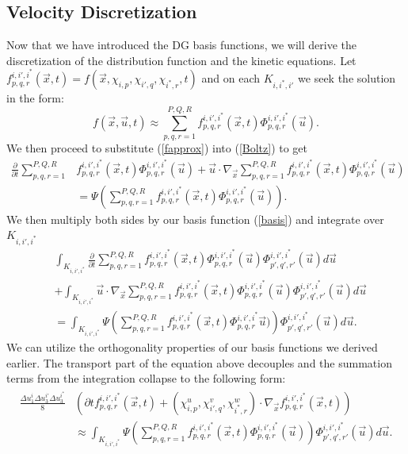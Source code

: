 \subsection{Velocity Discretization}
Now that we have introduced the DG basis functions, we will derive the discretization of the distribution function and the kinetic equations. Let $f^{i,i',i^*}_{p,q,r}(\vec{x},t) = f(\vec{x},\chi_{i,p},\chi_{i',q},\chi_{i^*,r},t)$ and on each $K_{i,i^*,i'}$ we seek the solution in the form:
%
\begin{equation}
\label{fapprox}
f(\vec{x},\vec{u},t) \approx \sum_{p,q,r = 1}^{P,Q,R} f^{i,i',i^*}_{p,q,r}(\vec{x},t) \Phi^{i,i',i^*}_{p,q,r} (\vec{u}).
\end{equation}
%
We then proceed to substitute (\ref{fapprox}) into (\ref{Boltz}) to get
%
\begin{align*}
\frac{\partial}{\partial t} \sum_{p,q,r = 1}^{P,Q,R}& f^{i,i',i^*}_{p,q,r}(\vec{x},t) \Phi^{i,i',i^*}_{p,q,r}(\vec{u}) + \vec{u} \cdot \nabla_{\vec{x}} \sum_{p,q,r = 1}^{P,Q,R} f^{i,i',i^*}_{p,q,r}(\vec{x},t) \Phi^{i,i',i^*}_{p,q,r}(\vec{u})\\
&= \Psi \left(\sum_{p,q,r = 1}^{P,Q,R} f^{i,i',i^*}_{p,q,r}(\vec{x},t) \Phi^{i,i',i^*}_{p,q,r}(\vec{u})\right).
\end{align*}
%
We then multiply both sides by our basis function (\ref{basis}) and integrate over $K_{i,i',i^*}$
%
\begin{align*}
&\int_{K_{i,i',i^*}} \frac{\partial}{\partial t} \sum_{p,q,r = 1}^{P,Q,R} f^{i,i',i^*}_{p,q,r}(\vec{x},t) \Phi^{i,i',i^*}_{p,q,r}(\vec{u}) \Phi^{i,i',i^*}_{p',q',r'}(\vec{u}) d\vec{u}\\
&+ \int_{K_{i,i',i^*}} \vec{u} \cdot \nabla_{\vec{x}} \sum_{p,q,r = 1}^{P,Q,R} f^{i,i',i^*}_{p,q,r}(\vec{x},t) \Phi^{i,i',i^*}_{p,q,r}(\vec{u}) \Phi^{i,i',i^*}_{p',q',r'}(\vec{u}) d\vec{u}\\
&= \int_{K_{i,i',i^*}} \Psi \left(\sum_{p,q,r = 1}^{P,Q,R} f^{i,i',i^*}_{p,q,r}(\vec{x},t) \Phi^{i,i',i^*}_{p,q,r}\vec{u})\right) \Phi^{i,i',i^*}_{p',q',r'}(\vec{u}) d\vec{u}.
\end{align*}
%
We can utilize the orthogonality properties of our basis functions we derived earlier. The transport part of the equation above decouples and the summation terms from the integration collapse to the following form:
%
\begin{gather}
\begin{aligned}
\label{discreting}
\frac{\Delta u_1^i \Delta u_3^{i'} \Delta u_3^{i^*}}{8} &\left( \partial t f^{i,i',i^*}_{p,q,r}(\vec{x},t) + (\chi_{i,p}^u,\chi_{i',q}^v,\chi_{i^*,r}^w) \cdot \nabla_{\vec{x}} f^{i,i',i^*}_{p,q,r}(\vec{x},t) \right) \\
&\approx \int_{K_{i,i',i^*}} \Psi \left(\sum_{p,q,r = 1}^{P,Q,R} f^{i,i',i^*}_{p,q,r}(\vec{x},t) \Phi^{i,i',i^*}_{p,q,r}(\vec{u})\right) \Phi^{i,i',i^*}_{p',q',r'}(\vec{u}) d\vec{u}.
\end{aligned}
\end{gather}
